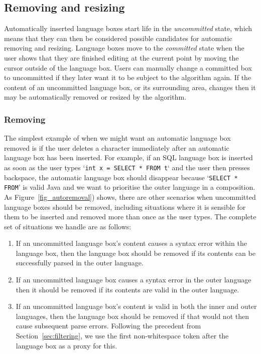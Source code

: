 \documentclass[sigplan,screen]{acmart}\settopmatter{printfolios=true,printccs=false,printacmref=false}
\begin{document}
\begin{center}
\end{center}


\subsection{Removing and resizing}

Automatically inserted language boxes start life in the \emph{uncommitted}
state, which means that they can then be considered possible candidates for
automatic removing and resizing. Language boxes move to the \emph{committed}
state when the user shows that they are finished
editing at the current point by moving the cursor outside of the language box.
Users can manually change a committed box to uncommitted if they
later want it to be subject to the algorithm again. If the content of an
uncommitted language box, or its surrounding area, changes then it may be
automatically removed or resized by the algorithm.


\subsubsection{Removing}
\label{sec:removing}

The simplest example of when we might want an automatic language box removed is if
the user deletes a character immediately after an automatic language box has
been inserted. For example, if an SQL language box is inserted as soon as the
user types `\texttt{int x = SELECT * FROM t}` and the user then presses
backspace, the automatic language box should disappear because `\texttt{SELECT
* FROM}' is valid Java and we want to prioritise the outer language in a
composition. As Figure~\ref{fig_autoremoval}) shows, there are other scenarios
when uncommitted language boxes should be removed, including situations where
it is sensible for them to be inserted and removed more than once as the user
types. The complete set of situations we handle are as follows:

\begin{enumerate}
  \item If an uncommitted language box's content causes a syntax error within
    the language box, then the language box should be removed if its contents
    can be successfully parsed in the outer language.
  \item If an uncommitted language box causes a syntax error in the outer
    language then it should be removed if its contents are valid in the
    outer language.
  \item If an uncommitted language box's content is valid in both the inner and
    outer languages, then the language box should be removed if that would not
    then cause subsequent parse errors. Following the precedent from
    Section~\ref{sec:filtering}, we use the first non-whitespace token after
    the language box as a proxy for this.
\end{enumerate}
\end{document}
